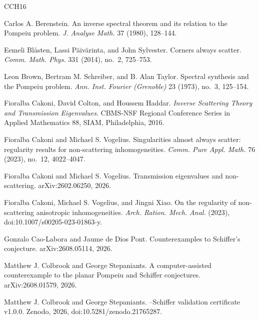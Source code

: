 \begin{thebibliography}{CCH16}

Carlos A. Berenstein.
\newblock An inverse spectral theorem and its relation to the {Pompeiu} problem.
\newblock \emph{J. Analyse Math.} 37 (1980), 128--144.

Eemeli Bl{\aa}sten, Lassi P{\"a}iv{\"a}rinta, and John Sylvester.
\newblock Corners always scatter.
\newblock \emph{Comm. Math. Phys.} 331 (2014), no.~2, 725--753.

Leon Brown, Bertram M. Schreiber, and B. Alan Taylor.
\newblock Spectral synthesis and the {Pompeiu} problem.
\newblock \emph{Ann. Inst. Fourier (Grenoble)} 23 (1973), no.~3, 125--154.

Fioralba Cakoni, David Colton, and Houssem Haddar.
\newblock \emph{Inverse Scattering Theory and Transmission Eigenvalues}.
\newblock CBMS-NSF Regional Conference Series in Applied Mathematics 88, SIAM,
Philadelphia, 2016.

Fioralba Cakoni and Michael S. Vogelius.
\newblock Singularities almost always scatter: regularity results for
non-scattering inhomogeneities.
\newblock \emph{Comm. Pure Appl. Math.} 76 (2023), no.~12, 4022--4047.

Fioralba Cakoni and Michael S. Vogelius.
\newblock Transmission eigenvalues and non-scattering.
\newblock arXiv:2602.06250, 2026.

Fioralba Cakoni, Michael S. Vogelius, and Jingni Xiao.
\newblock On the regularity of non-scattering anisotropic inhomogeneities.
\newblock \emph{Arch. Ration. Mech. Anal.} (2023), doi:10.1007/s00205-023-01863-y.

Gonzalo Cao-Labora and Jaume de Dios Pont.
\newblock Counterexamples to {Schiffer}'s conjecture.
\newblock arXiv:2608.05114, 2026.

Matthew J. Colbrook and George Stepaniants.
\newblock A computer-assisted counterexample to the planar {Pompeiu} and
{Schiffer} conjectures.
\newblock arXiv:2608.01579, 2026.

Matthew J. Colbrook and George Stepaniants.
--{Schiffer} validation certificate v1.0.0.
\newblock Zenodo, 2026, doi:10.5281/zenodo.21765287.


\end{thebibliography}
